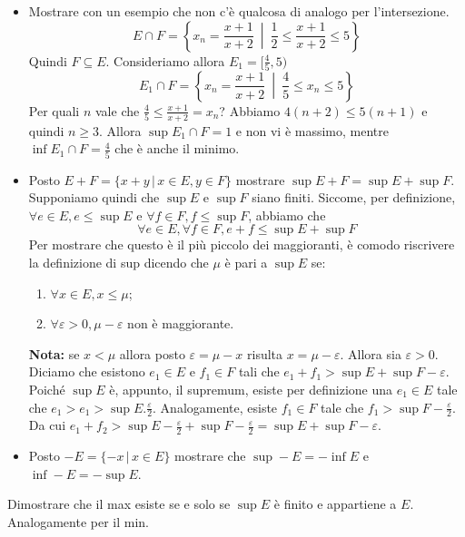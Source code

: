 \documentclass[a4paper]{article}
\begin{document}
{\begin{itemize}
        in quanto fa parte dell'insieme.
        \item Mostrare con un esempio che non c'è qualcosa di analogo per l'intersezione.
        \[
            E \cap F = \left\{ x_n = \frac{x+1}{x+2} \ \middle|\ \frac{1}{2} \leq \frac{x+1}{x+2} \leq 5 \right\}
        \]
        Quindi \(F \subseteq E\). Consideriamo allora \(E_1 = [\frac{4}{5}, 5)\)
        \[
            E_1 \cap F = \left\{ x_n = \frac{x+1}{x+2} \ \middle|\ \frac{4}{5} \leq x_n \leq 5 \right\}
        \]
        Per quali \(n\) vale che \(\frac{4}{5} \leq \frac{x+1}{x+2} = x_n\)?
        Abbiamo \(4(n+2) \leq 5(n+1)\) e quindi \(n \geq 3\).
        Allora \(\sup E_1 \cap F = 1\) e non vi è massimo, mentre \(\inf E_1 \cap F = \frac{4}{5}\)
        che è anche il minimo.
        \item Posto \(E+F = \{ x + y \,|\, x \in E, y \in F \}\)
        mostrare \(\sup E + F = \sup E + \sup F\). Supponiamo quindi che \(\sup E\) e \(\sup F\)
        siano finiti. Siccome, per definizione, \(\forall e \in E, e \leq \sup E\)
        e \(\forall f \in F, f \leq \sup F\), abbiamo che \[\forall e \in E, \forall f\in F, e + f \leq \sup E + \sup F\]
        Per mostrare che questo è il più piccolo dei maggioranti, è comodo riscrivere la definizione di
        sup dicendo che \(\mu\) è pari a \(\sup E\) se:
        \begin{enumerate}
            \item \(\forall x \in E, x\leq \mu\);
            \item \(\forall \varepsilon > 0, \mu - \varepsilon\) non è maggiorante.
        \end{enumerate}
        \textbf{Nota:} se \(x < \mu\) allora posto \(\varepsilon = \mu - x\) risulta \(x = \mu - \varepsilon\).
        Allora sia \(\varepsilon > 0\). Diciamo che esistono \(e_1\in E\) e \(f_1\in F\) tali che
        \(e_1 + f_1 > \sup E + \sup F - \varepsilon\).
        Poiché \(\sup E\) è, appunto, il supremum, esiste per definizione una \(e_1 \in E\) tale che
        \(e_1 > e_1 > \sup E . \frac{\varepsilon}{2}\).
        Analogamente, esiste \(f_1 \in F\) tale che \(f_1 > \sup F - \frac{\varepsilon}{2}\).
        Da cui \(e_1 + f_2 > \sup E - \frac{\varepsilon}{2} + \sup F - \frac{\varepsilon}{2} = \sup E + \sup F - \varepsilon\).
        \item Posto \(-E = \{ -x \,|\, x \in E\}\) mostrare che
        \(\sup -E = -\inf E\) e \(\inf -E = -\sup E\).
    \end{itemize}
}

Dimostrare che il max esiste se e solo se \(\sup E\) è finito e appartiene a \(E\).
Analogamente per il min.
\end{document}
